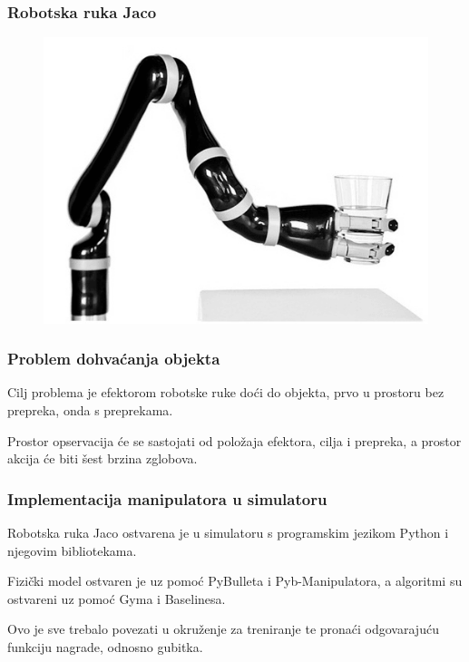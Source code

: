 \documentclass{beamer}
\begin{document}
\begin{frame}
	\frametitle{Robotska ruka Jaco}

	\begin{figure}[ht!]
		\centering
		\includegraphics[width=0.9\columnwidth]{img/jaco.png}
		\label{fig:jaco}
	\end{figure}

\end{frame}

\begin{frame}
	\frametitle{Problem dohvaćanja objekta}

	Cilj problema je efektorom robotske ruke doći do objekta, prvo u prostoru bez prepreka, onda s preprekama.
	\bigskip

	Prostor opservacija će se sastojati od položaja efektora, cilja i prepreka, a prostor akcija će biti šest brzina zglobova.

\end{frame}

\begin{frame}
	\frametitle{Implementacija manipulatora u simulatoru}

	Robotska ruka Jaco ostvarena je u simulatoru s programskim jezikom Python i njegovim bibliotekama.
	\bigskip

	Fizički model ostvaren je uz pomoć PyBulleta i Pyb-Manipulatora, a algoritmi su ostvareni uz pomoć Gyma i Baselinesa.
	\bigskip

	Ovo je sve trebalo povezati u okruženje za treniranje te pronaći odgovarajuću funkciju nagrade, odnosno gubitka.

\end{frame}
\end{document}
